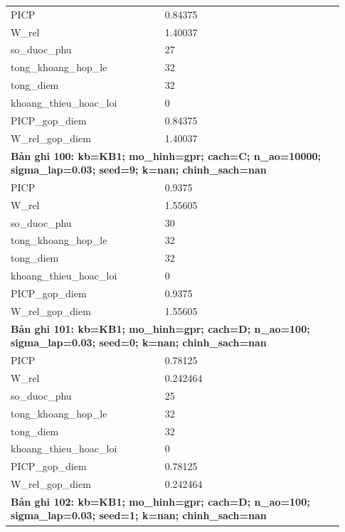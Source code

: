 \begin{longtable}{p{0.43\linewidth}p{0.50\linewidth}}
PICP & 0.84375 \\
W\_\allowbreak rel & 1.40037 \\
so\_\allowbreak duoc\_\allowbreak phu & 27 \\
tong\_\allowbreak khoang\_\allowbreak hop\_\allowbreak le & 32 \\
tong\_\allowbreak diem & 32 \\
khoang\_\allowbreak thieu\_\allowbreak hoac\_\allowbreak loi & 0 \\
PICP\_\allowbreak gop\_\allowbreak diem & 0.84375 \\
W\_\allowbreak rel\_\allowbreak gop\_\allowbreak diem & 1.40037 \\
\midrule
\multicolumn{2}{p{0.95\linewidth}}{\textbf{Bản ghi 100: kb=KB1; mo\_hinh=gpr; cach=C; n\_ao=10000; sigma\_lap=0.03; seed=9; k=nan; chinh\_sach=nan}} \\
PICP & 0.9375 \\
W\_\allowbreak rel & 1.55605 \\
so\_\allowbreak duoc\_\allowbreak phu & 30 \\
tong\_\allowbreak khoang\_\allowbreak hop\_\allowbreak le & 32 \\
tong\_\allowbreak diem & 32 \\
khoang\_\allowbreak thieu\_\allowbreak hoac\_\allowbreak loi & 0 \\
PICP\_\allowbreak gop\_\allowbreak diem & 0.9375 \\
W\_\allowbreak rel\_\allowbreak gop\_\allowbreak diem & 1.55605 \\
\midrule
\multicolumn{2}{p{0.95\linewidth}}{\textbf{Bản ghi 101: kb=KB1; mo\_hinh=gpr; cach=D; n\_ao=100; sigma\_lap=0.03; seed=0; k=nan; chinh\_sach=nan}} \\
PICP & 0.78125 \\
W\_\allowbreak rel & 0.242464 \\
so\_\allowbreak duoc\_\allowbreak phu & 25 \\
tong\_\allowbreak khoang\_\allowbreak hop\_\allowbreak le & 32 \\
tong\_\allowbreak diem & 32 \\
khoang\_\allowbreak thieu\_\allowbreak hoac\_\allowbreak loi & 0 \\
PICP\_\allowbreak gop\_\allowbreak diem & 0.78125 \\
W\_\allowbreak rel\_\allowbreak gop\_\allowbreak diem & 0.242464 \\
\midrule
\multicolumn{2}{p{0.95\linewidth}}{\textbf{Bản ghi 102: kb=KB1; mo\_hinh=gpr; cach=D; n\_ao=100; sigma\_lap=0.03; seed=1; k=nan; chinh\_sach=nan}} \\

\end{longtable}
